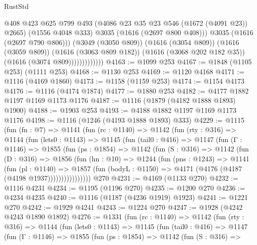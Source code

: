 \begin{lexlean}{RustStd}
\begin{coremodule}
                              @408
                              @423
                              @625
                              @799
                              @493
                              (@4086 @23 @35 @23 @546 (@1672 (@4091 @23)) @2665)
                              (@1556 @4048 @333)
                              @3035
                              (@1616 (@2697 @800 @408)))
                            @3035
                            (@1616 (@2697 @790 @806)))
                          (@3049 (@3050 @809))
                          (@1616 (@3054 @809))
                          (@1616 (@3059 @809))
                          (@1616 (@3063 @809 @182))
                          (@1616 (@3068 @202 @182 @35))
                          (@1616 (@3074 @809)))))))))))))
@4163 := @1099 @253
@4167 := @1848 (@1105 @253) (@1111 @253)
@4168 := @1130 @253
@4169 := @1120 @4168
@4171 := @1116 (@4169 @1860)
@4173 := @1158 (@1159 @253)
@4174 := @1154 @4173
@4176 := @1116 (@4174 @1874)
@4177 := @1880 @253
@4182 := @4177 @1882 @1197 @1169 @1173 @1176
@4187 := @1116 (@1879 (@4182 @1888 @1893) @1900)
@4188 := @1903 @253
@4193 := @4188 @1882 @1197 @1169 @1173 @1176
@4198 := @1116 (@1246 (@4193 @1888 @1893) @333)
@4229 := @1115
    (fun (fn : @7) =>
    @1141
      (fun (rc : @1140) =>
      @1142
        (fun (rty : @316) =>
        @1144
          (fun (lets0 : @1143) =>
          @1145
            (fun (tail0 : @416) =>
            @1147
              (fun (Γ : @1146) =>
              @1855
                (fun (ps : @1854) =>
                @1142
                  (fun (S : @316) =>
                  @1142
                    (fun (D : @316) =>
                    @1856
                      (fun (hn : @10) =>
                      @1244
                        (fun (pns : @1243) =>
                        @1141
                          (fun (pl : @1140) =>
                          @1857
                            (fun (bodyL : @1150) => @4171 (@4176 (@4187 (@4198 @1937))))))))))))))))
    @270
@4231 := @4169 (@1133 @270)
@4232 := @1116 @4231
@4234 := @1195 (@1196 @270)
@4235 := @1200 @270
@4236 := @4234 @4235
@4240 := @1116 (@1187 (@4236 @1919) @1923)
@4241 := @1221 @270
@4242 := @1929 @4241
@4243 := @1224 @270
@4247 := @1928 (@4242 @4243 @1890 @1892)
@4276 := @1331
    (fun (rc : @1140) =>
    @1142
      (fun (rty : @316) =>
      @1144
        (fun (lets0 : @1143) =>
        @1145
          (fun (tail0 : @416) =>
          @1147
            (fun (Γ : @1146) =>
            @1855
              (fun (ps : @1854) =>
              @1142
                (fun (S : @316) =>

\end{coremodule}
\end{lexlean}
